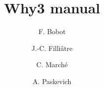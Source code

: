 \documentclass[a4paper]{memoir}
\begin{document}
\title{Why3 manual}
\author{F. Bobot \and J.-C. Filli\^atre \and C. March\'e \and A. Paskevich}
\maketitle

\cleardoublepage

\tableofcontents








\end{document}
